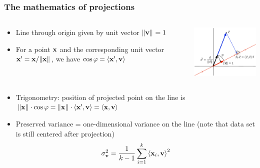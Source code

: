 \begin{frame}
  \frametitle{The mathematics of projections}

  \begin{columns}[c]
    \begin{column}{50mm}
      \begin{itemize}
      \item Line through origin given by unit vector
        $\norm{\vv} = 1$
      \item For a point $\vx$ and the corresponding unit vector $\vx' = \vx /
        \norm{\vx}$, we have \( \cos \varphi = \sprod{\vx'}{\vv} \)
      \end{itemize}
    \end{column}
    \begin{column}{50mm}
      \includegraphics[width=50mm]{img/3_cosine_projection}
    \end{column}
  \end{columns}
  
  \pause
  \begin{itemize}
  \item Trigonometry: position of projected point on the line is
    $\norm{\vx}\cdot \cos\varphi = \norm{\vx}\cdot \sprod{\vx'}{\vv} =
    \sprod{\vx}{\vv}$
  \item Preserved variance = one-dimensional variance on the line
    (note that data set is still centered after projection)
    \[
    \sigma_{\vv}^2 = \frac{1}{k-1} \sum_{i=1}^k \sprod{\vx_i}{\vv}^2
    \]
  \end{itemize}
\end{frame}


